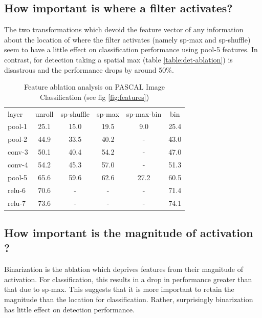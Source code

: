 \documentclass[runningheads]{llncs}
\begin{document}
\subsection{How important is where a filter activates?}
\label{sub:imp-loc}
The two transformations which devoid the feature vector of any information about the location of where the filter activates (namely sp-max and sp-shuffle) seem to have a little effect on classification performance using pool-5 features. In contrast, for detection taking a spatial max (table \ref{table:det-ablation}) is disastrous and the performance drops by around 50\%. 
\setlength{\tabcolsep}{4pt}
\begin{table}[t!]
\begin{center}
\caption{Feature ablation analysis on PASCAL Image Classification (see fig \ref{fig:features})}
\label{table:class-ablation}
\begin{tabular}{lccccc}
\hline\noalign{\smallskip}
layer & unroll & sp-shuffle & sp-max & sp-max-bin & bin \\
\noalign{\smallskip}
\hline
\noalign{\smallskip}
pool-1 & 25.1 & 15.0 & 19.5 & 9.0 & 25.4  \\ 
pool-2 & 44.9 & 33.5 & 40.2 & - &43.0 \\ 
conv-3 & 50.1 & 40.4 & 54.2 & - &47.0 \\
conv-4 & 54.2 & 45.3 & 57.0 & - &51.3  \\
pool-5 & 65.6 & 59.6 & 62.6 & 27.2 &60.5 \\
relu-6 & 70.6 &  -   &  -   & -& 71.4     \\
relu-7 & 73.6 &  -   &  -   & - &74.1     \\
\hline
\end{tabular}
\end{center}
\end{table}
\setlength{\tabcolsep}{1.4pt}

\subsection{How important is the magnitude of activation ?}
\label{sub:imp-mag}
Binarization is the ablation which deprives features from their magnitude of activation. For classification, this results in a drop in performance greater than that due to sp-max. This suggests that it is more important to retain the magnitude than the location for classification. Rather, surprisingly binarization has little effect on detection performance.
\end{document}
